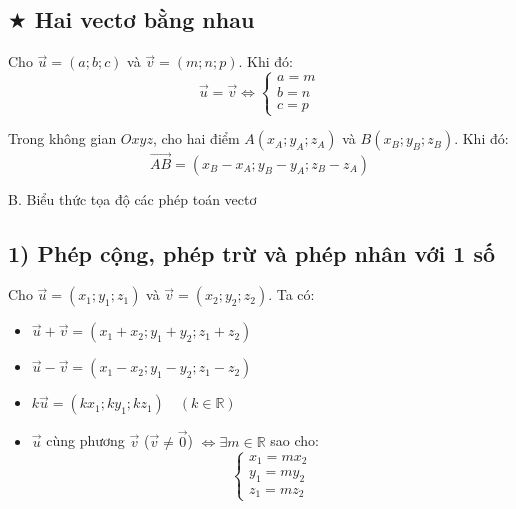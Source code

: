 \documentclass[12pt,a4paper]{extarticle}
\begin{document}
\vspace{2em}

\subsection*{$\bigstar$ Hai vectơ bằng nhau}

\noindent Cho $\vec{u} = (a; b; c)$ và $\vec{v} = (m; n; p)$. Khi đó:
\[
\vec{u} = \vec{v} \Leftrightarrow \begin{cases} a = m \\ b = n \\ c = p \end{cases}
\]

\vspace{1em}
\noindent Trong không gian $Oxyz$, cho hai điểm $A(x_A; y_A; z_A)$ và $B(x_B; y_B; z_B)$. Khi đó:
\[
\vec{AB} = (x_B - x_A; y_B - y_A; z_B - z_A)
\]


\begin{center}
    \begin{tcolorbox}[
        colback=red!5!white,
        colframe=red!75!black,
        fontupper=\bfseries\large\color{red!75!black},
        arc=3mm,
        width=11cm,
        size=small,
        halign=center
    ]
        B. Biểu thức tọa độ các phép toán vectơ
    \end{tcolorbox}
\end{center}
\vspace{1em}
\subsection*{1) Phép cộng, phép trừ và phép nhân với 1 số}
\noindent Cho $\vec{u} = (x_1; y_1; z_1)$ và $\vec{v} = (x_2; y_2; z_2)$. Ta có:
\begin{itemize}[leftmargin=*, label=$\bullet$, itemsep=0.5em]
    \item $\vec{u} + \vec{v} = (x_1 + x_2; y_1 + y_2; z_1 + z_2)$
    \item $\vec{u} - \vec{v} = (x_1 - x_2; y_1 - y_2; z_1 - z_2)$
    \item $k\vec{u} = (kx_1; ky_1; kz_1) \quad (k \in \mathbb{R})$
    \item $\vec{u}$ cùng phương $\vec{v}$ ($\vec{v} \neq \vec{0}$) $\Leftrightarrow \exists m \in \mathbb{R}$ sao cho:
    \[
    \begin{cases}
        x_1 = m x_2 \\
        y_1 = m y_2 \\
        z_1 = m z_2
    \end{cases}
    \]
\end{itemize}
\vspace{1em}
\end{document}
